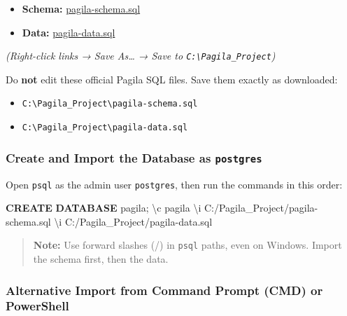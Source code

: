 \documentclass[
  letterpaper,
  DIV=11,
  numbers=noendperiod]{scrartcl}
\newenvironment{Shaded}{\begin{snugshade}}{\end{snugshade}}
\newcommand{\KeywordTok}[1]{\textcolor[rgb]{0.00,0.23,0.31}{\textbf{#1}}}
\newcommand{\NormalTok}[1]{\textcolor[rgb]{0.00,0.23,0.31}{#1}}
\newcommand{\StringTok}[1]{\textcolor[rgb]{0.13,0.47,0.30}{#1}}
\providecommand{\tightlist}{%
  \setlength{\itemsep}{0pt}\setlength{\parskip}{0pt}}\usepackage{longtable,booktabs,array}
\begin{document}
\begin{itemize}
\tightlist
\item
  \textbf{Schema:}
  \href{https://raw.githubusercontent.com/devrimgunduz/pagila/master/pagila-schema.sql}{pagila-schema.sql}
\item
  \textbf{Data:}
  \href{https://raw.githubusercontent.com/devrimgunduz/pagila/master/pagila-data.sql}{pagila-data.sql}
\end{itemize}

\emph{(Right-click links → Save As\ldots{} → Save to
\texttt{C:\textbackslash{}Pagila\_Project})}

Do \textbf{not} edit these official Pagila SQL files. Save them exactly
as downloaded:

\begin{itemize}
\tightlist
\item
  \texttt{C:\textbackslash{}Pagila\_Project\textbackslash{}pagila-schema.sql}
\item
  \texttt{C:\textbackslash{}Pagila\_Project\textbackslash{}pagila-data.sql}
\end{itemize}

\subsubsection{\texorpdfstring{Create and Import the Database as
\texttt{postgres}}{Create and Import the Database as postgres}}\label{create-and-import-the-database-as-postgres}

Open \texttt{psql} as the admin user \texttt{postgres}, then run the
commands in this order:

\begin{Shaded}
\begin{Highlighting}[]
\KeywordTok{CREATE} \KeywordTok{DATABASE}\NormalTok{ pagila;}
\NormalTok{\textbackslash{}c pagila}
\NormalTok{\textbackslash{}i }\StringTok{\textquotesingle{}C:/Pagila\_Project/pagila{-}schema.sql\textquotesingle{}}
\NormalTok{\textbackslash{}i }\StringTok{\textquotesingle{}C:/Pagila\_Project/pagila{-}data.sql\textquotesingle{}}
\end{Highlighting}
\end{Shaded}

\begin{quote}
\textbf{Note:} Use forward slashes (/) in \texttt{psql} paths, even on
Windows. Import the schema first, then the data.
\end{quote}

\subsubsection{Alternative Import from Command Prompt (CMD) or
PowerShell}\label{alternative-import-from-command-prompt-cmd-or-powershell}
\end{document}
